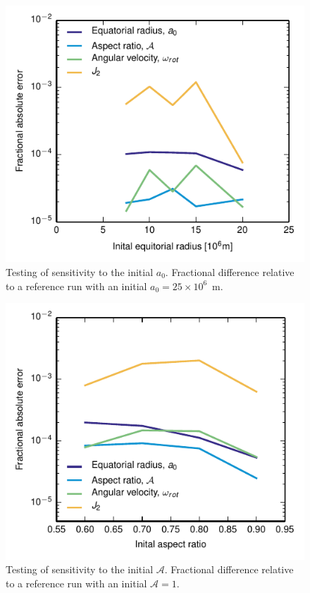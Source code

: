 \documentclass[11pt, oneside]{article}   	%
\begin{document}
\begin{figure}[]
   \centering
   \includegraphics[]{Figures/Test_ICr.pdf} 
   \caption{Testing of sensitivity to the initial $a_0$. Fractional difference relative to a reference run with an initial $a_0 = 25 \times 10^{6}$~m.}
   \label{HUG:fig:test_ICr}
\end{figure}

\begin{figure}[]
   \centering
   \includegraphics[]{Figures/Test_ICa.pdf} 
   \caption{Testing of sensitivity to the initial $\mathcal{A}$. Fractional difference relative to a reference run with an initial $\mathcal{A}=1$.}
   \label{HUG:fig:test_ICA}
\end{figure}
\clearpage
                                      
\end{document}
